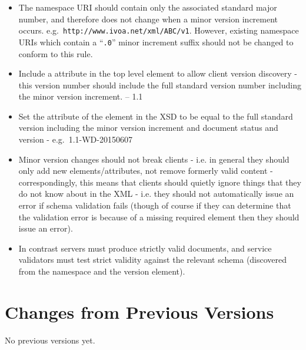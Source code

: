 \documentclass[10pt,a4paper]{ivoa}
\begin{document}
\begin{itemize}
\item The namespace URI should contain only the associated standard major number, 
and therefore does not change when a minor version increment occurs.
e.g.\ \texttt{http://www.ivoa.net/xml/ABC/v1}. However, existing namespace URIs
which contain a ``\texttt{.0}'' minor increment suffix should not be changed to
conform to this rule.

\item Include a  attribute in the top level element to allow
client version discovery - this version number should include the full standard version
number including the minor version increment. -- 1.1

\item Set the  attribute of the  element in the
XSD to be equal to the full standard version including the minor version
increment and document status and version - e.g.\ 1.1-WD-20150607

\item Minor version changes should not break clients - i.e. in general they
should only add new elements/attributes, not remove formerly valid content -
correspondingly, this means that clients should quietly ignore things that they
do not know about in the XML - i.e. they should not automatically issue an error
if schema validation fails (though of course if they can determine that the
validation error is because of a missing required element then they should
issue an error).
\item In contrast servers must produce strictly valid documents, and service
validators must test strict validity against the relevant schema (discovered
from the namespace and the version element).
\end{itemize}




\appendix


\section{Changes from Previous Versions}

No previous versions yet.  



\end{document}
